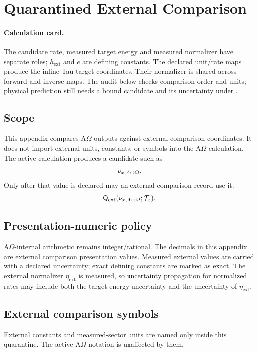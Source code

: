 \section{Quarantined External Comparison}\label{manual:external-comparison}

\paragraph{Calculation card.}
The candidate rate, measured target energy and measured normalizer have
separate roles; \(h_{\mathrm{ext}}\) and \(e\) are defining constants.
The declared unit/rate maps produce the inline Tau target coordinates.
Their normalizer is shared across forward and inverse maps. The audit below
checks comparison order and units; physical prediction still needs a bound
candidate and its uncertainty under .



\subsection{Scope}\label{manual:external-comparison:scope}
This appendix compares A\(\Omega\) outputs against external comparison coordinates. It does not import external units, constants, or symbols into the A\(\Omega\) calculation. The active calculation produces a candidate such as
\[
\nu_{x,A{\leftrightarrow}\Omega}.
\]
Only after that value is declared may an external comparison record use it:
\[
\mathsf{Q}_{\mathrm{ext}}(\nu_{x,A{\leftrightarrow}\Omega};\mathcal T_x).
\]



\subsection{Presentation-numeric policy}\label{manual:external-comparison:presentation-numeric-policy}
A\(\Omega\)-internal arithmetic remains integer/rational. The decimals in this appendix are external comparison presentation values. Measured external values are carried with a declared uncertainty; exact defining constants are marked as exact. The external normalizer \(\eta_{\mathrm{ext}}\) is measured, so uncertainty propagation for normalized rates may include both the target-energy uncertainty and the uncertainty of \(\eta_{\mathrm{ext}}\).

\subsection{External comparison symbols}\label{manual:external-comparison-symbols}
External constants and measured-sector units are named only inside this quarantine. The active A\(\Omega\) notation is unaffected by them.

